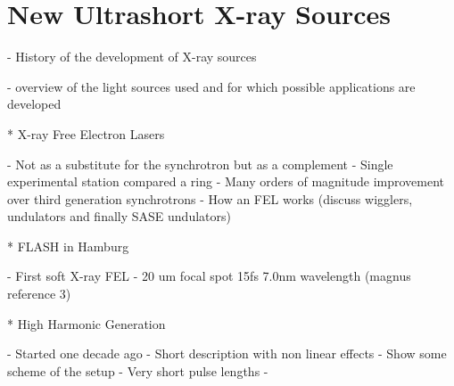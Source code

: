 \chapter{New Ultrashort X-ray Sources}\label{Ultrashort X-ray Sources}\noindent
 

- History of the development of X-ray sources

- overview of the light sources used and for which possible applications are developed

* X-ray Free Electron Lasers

- Not as a substitute for the synchrotron but as a complement
- Single experimental station compared a ring
- Many orders of magnitude improvement over third generation synchrotrons
- How an FEL works (discuss wigglers, undulators and finally SASE undulators)


* FLASH in Hamburg 

- First soft X-ray FEL
- 20 um focal spot 15fs 7.0nm wavelength (magnus reference 3)

* High Harmonic Generation

- Started one decade ago
- Short description with non linear effects
- Show some scheme of the setup
- Very short pulse lengths
- 